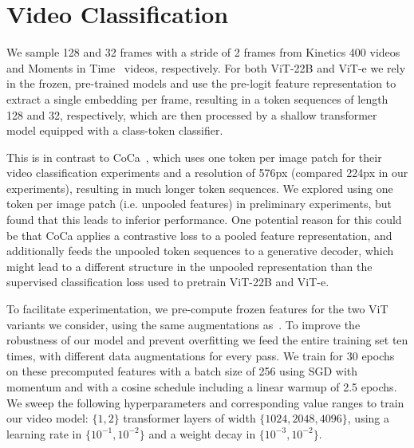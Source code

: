 \section{Video Classification}
\label{sec:app_video_classification}

We sample 128 and 32 frames with a stride of 2 frames from Kinetics 400 videos~\citep{kay2017kinetics} and Moments in Time~\citep{monfort2019moments} videos, respectively. For both ViT-22B and ViT-e we rely in the frozen, pre-trained models and use the pre-logit feature representation to extract a single embedding per frame, resulting in a token sequences of length 128 and 32, respectively, which are then processed by a shallow transformer model equipped with a class-token classifier.

This is in contrast to CoCa~\citep{yu2022coca}, which uses one token per image patch for their video classification experiments and a resolution of 576px (compared 224px in our experiments), resulting in much longer token sequences. We explored using one token per image patch (i.e. unpooled features) in preliminary experiments, but found that this leads to inferior performance. One potential reason for this could be that CoCa applies a contrastive loss to a pooled feature representation, and additionally feeds the unpooled token sequences to a generative decoder, which might lead to a different structure in the unpooled representation than the supervised classification loss used to pretrain ViT-22B and ViT-e.

To facilitate experimentation, we pre-compute frozen features for the two ViT variants we consider, using the same augmentations as~\citep{arnab2021vivit}. To improve the robustness of our model and prevent overfitting we feed the entire training set ten times, with different data augmentations for every pass. We train for 30 epochs on these precomputed features with a batch size of 256 using SGD with momentum and with a cosine schedule including a linear warmup of 2.5 epochs. We sweep the following hyperparameters and corresponding value ranges to train our video model: $\{1, 2\}$ transformer layers of width $\{1024, 2048, 4096\}$, using a learning rate in $\{10^{-1}, 10^{-2}\}$ and a weight decay in $\{10^{-3}, 10^{-2}\}$.
